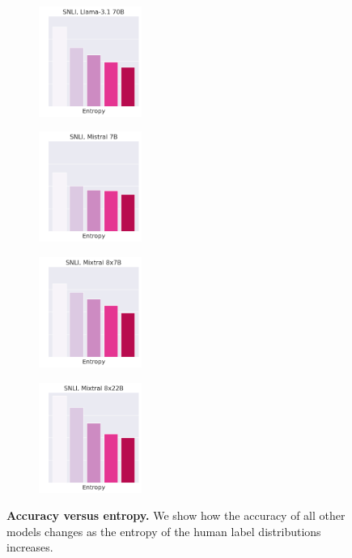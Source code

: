 \begin{figure}[t]
\begin{subfigure}[b]{0.23\textwidth}
    \end{subfigure}\\
    \begin{subfigure}[b]{0.23\textwidth}
        \includegraphics[height=3.6cm]{figures/appendix/entropy_acc_snli_70B}
    \end{subfigure}
    \begin{subfigure}[b]{0.23\textwidth}
        \includegraphics[height=3.6cm]{figures/appendix/entropy_acc_snli_7B}
    \end{subfigure}
    \begin{subfigure}[b]{0.23\textwidth}
        \includegraphics[height=3.6cm]{figures/appendix/entropy_acc_snli_8x7B}
    \end{subfigure}
    \begin{subfigure}[b]{0.23\textwidth}
        \includegraphics[height=3.6cm]{figures/appendix/entropy_acc_snli_8x22B}
    \end{subfigure}
    \caption{\textbf{Accuracy versus entropy.} We show how the accuracy of all other models changes as the entropy of the human label distributions increases.}
    \label{fig:entropy_accuracy_all}
\end{figure}

